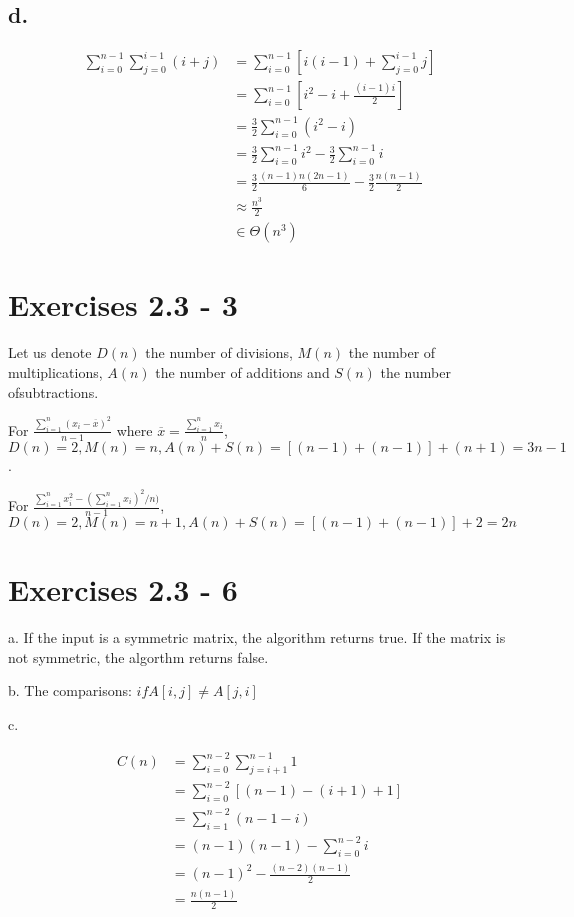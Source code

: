 \documentclass{article}
\begin{document}
\subsection{d.}

\begin{align*}
\sum_{i=0}^{n-1}\sum_{j=0}^{i-1}(i+j)&= \sum_{i=0}^{n-1}[i(i-1) + \sum_{j=0}^{i-1}j] \\
&= \sum_{i=0}^{n-1}[i^2 -i + \frac{(i-1)i}{2}]\\
&= \frac{3}{2}\sum_{i=0}^{n-1}(i^2 -i)\\
&= \frac{3}{2}\sum_{i=0}^{n-1}i^2 - \frac{3}{2}\sum_{i=0}^{n-1}i\\
&= \frac{3}{2}\frac{(n-1)n(2n-1)}{6} - \frac{3}{2}\frac{n(n-1)}{2}\\
&\approx \frac{n^3}{2}\\
&\in \Theta(n^3)
\end{align*}

\section{Exercises 2.3 - 3}

Let us denote $D(n)$ the number of divisions, $M(n)$ the number of multiplications, $A(n)$ the number of additions and $S(n)$ the number ofsubtractions.

For $\frac{\sum_{i=1}^n(x_i-\overline{x})^2}{n-1}$ where
$\overline{x} = \frac{\sum_{i=1}^{n}x_i}{n}$,
$D(n)=2, M(n) = n, A(n) + S(n) = [(n-1) +(n-1)] + (n + 1) = 3n-1$.

For $\frac{\sum_{i=1}^{n}x_i^2 - (\sum_{i=1}^nx_i)^2/n)}{n-1}$,
$D(n)=2, M(n) = n + 1, A(n) + S(n) =[(n- 1) + (n- 1)] + 2 = 2n$

\section{Exercises 2.3 - 6}

a. If the input is a symmetric matrix, the algorithm returns true. If the matrix is not symmetric, the algorthm returns false.

b. The comparisons: $if A[i, j ] \ne A[j, i]$

c.

\begin{align*}
C(n) &= \sum_{i=0}^{n-2}\sum_{j=i+1}^{n-1}1\\
&= \sum_{i=0}^{n-2}[(n-1)-(i+1)+1]\\
&= \sum_{i=1}^{n-2}(n-1-i)\\
&= (n-1)(n-1) - \sum_{i=0}^{n-2}i\\
&= (n-1)^2 - \frac{(n-2)(n-1)}{2}\\
&= \frac{n(n-1)}{2}
\end{align*}
\end{document}
